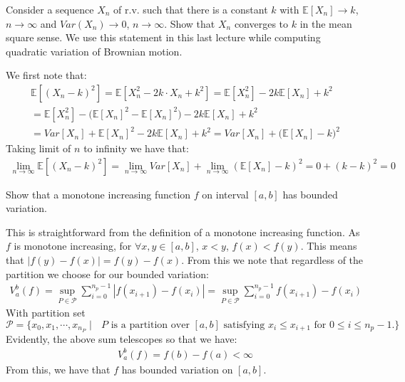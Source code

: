\documentclass[12pt,twoside, letter]{exam}
\theoremstyle{definition}
\newcommand{\ee}{\mathbb{E}}
\begin{document}
 Consider a sequence $X_{n}$ of r.v. such that there is a constant $k$ with $\ee[X_{n}] \rightarrow k$, $n \rightarrow \infty$ and
$Var(X_{n}) \rightarrow 0$, $n \rightarrow \infty$. Show that $X_{n}$ converges to $k$ in the mean square sense. We use this statement in this last lecture while
computing quadratic variation of Brownian motion.

\begin{solution}
  We first note that:
  \begin{multline*}
    \ee[(X_{n} - k)^2] = \ee[X_{n}^2 - 2k\cdot X_{n} + k^2] = \ee[X_{n}^2] - 2k\ee[X_{n}] + k^2 \\
    = \ee[X_{n}^2] - \big(\ee[X_{n}]^2 - \ee[X_{n}]^2 \big) - 2k\ee[X_{n}] + k^2 \\
    = Var[X_{n}] + \ee[X_{n}]^2 - 2k\ee[X_{n}] + k^2 = Var[X_{n}] + \big(\ee[X_{n}] - k \big)^2
  \end{multline*}
  Taking limit of $n$ to infinity we have that:
  \begin{align*}
    \lim_{n \rightarrow \infty} \ee[(X_{n} - k)^2] = \lim_{n \rightarrow \infty} Var[X_{n}] + \lim_{n \rightarrow \infty} (\ee[X_{n}] - k )^2
     = 0 + (k - k)^2 = 0
  \end{align*}
\end{solution}

 Show that a monotone increasing function $f$ on interval $[a,b]$ has bounded variation.

\begin{solution}
  This is straightforward from the definition of a monotone increasing function. As $f$ is monotone increasing, for $\forall x,y \in [a,b]$, $x < y$, $f(x) < f(y)$. This means that
  $|f(y) - f(x)| = f(y) - f(x)$. From this we note that regardless of the partition we choose for our bounded variation:
  \begin{align*}
    V^b_a(f) = \sup_{P\in \mathcal{P}} \sum^{n_{p} - 1}_{i=0} |f(x_{i+1}) - f(x_{i})| = \sup_{P\in \mathcal{P}} \sum^{n_{p} - 1}_{i=0} f(x_{i+1}) - f(x_{i})
  \end{align*}
  With partition set \\
  $\mathcal{P} = \{x_0, x_1, \cdots, x_{n_P} \mid \text{ $P$ is a partition over $[a,b]$ satisfying $x_{i} \leq x_{i+1}$ for $0 \leq i \leq n_{p}-1$}.\}$
  Evidently, the above sum telescopes so that we have:
  \begin{align*}
    V^b_a(f) = f(b) - f(a) < \infty
  \end{align*}
  From this, we have that $f$ has bounded variation on $[a,b]$.
\end{solution}
\end{document}
